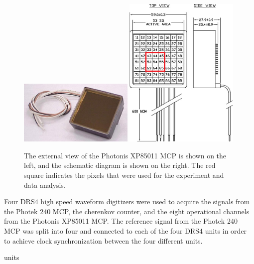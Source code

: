 \documentclass[12pt]{article}
\begin{document}
{\begin{figure}[htbp] \centering
\includegraphics[width=0.49\textwidth]{Images/photonis/photonis.jpg}
\includegraphics[width=0.49\textwidth]{Images/photonis/photonis2.png}
\caption{The external view of the Photonis XP85011 MCP is shown on the left, and
the schematic diagram is shown on the right. The red square indicates the pixels
that were used for the experiment and data analysis.} 	\label{fig:photonis} \end{figure}


Four DRS4 high speed waveform digitizers were used to acquire the signals from
the Photek 240 MCP, the cherenkov counter, and the eight operational channels
from the Photonis XP85011 MCP. The reference signal from the Photek 240 MCP was 
split into four and connected to each of the four DRS4 units in order to achieve 
clock synchronization between the four different units. 

units



}
\end{document}
